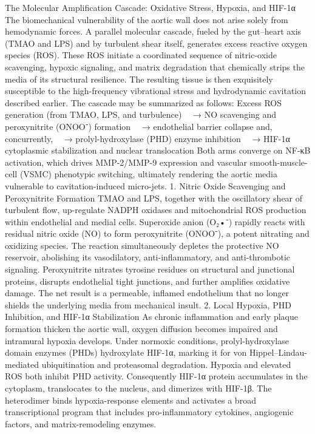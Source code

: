 The Molecular Amplification Cascade: Oxidative Stress, Hypoxia, and HIF-1α
The biomechanical vulnerability of the aortic wall does not arise solely from hemodynamic forces. A parallel molecular cascade, fueled by the gut–heart axis (TMAO and LPS) and by turbulent shear itself, generates excess reactive oxygen species (ROS). These ROS initiate a coordinated sequence of nitric-oxide scavenging, hypoxic signaling, and matrix degradation that chemically strips the media of its structural resilience. The resulting tissue is then exquisitely susceptible to the high-frequency vibrational stress and hydrodynamic cavitation described earlier. The cascade may be summarized as follows:
Excess ROS generation (from TMAO, LPS, and turbulence)
 → NO scavenging and peroxynitrite (ONOO⁻) formation
 → endothelial barrier collapse  
and, concurrently,  
 → prolyl-hydroxylase (PHD) enzyme inhibition
 → HIF-1α cytoplasmic stabilization and nuclear translocation  
Both arms converge on NF-κB activation, which drives MMP-2/MMP-9 expression and vascular smooth-muscle-cell (VSMC) phenotypic switching, ultimately rendering the aortic media vulnerable to cavitation-induced micro-jets.
1. Nitric Oxide Scavenging and Peroxynitrite Formation
TMAO and LPS, together with the oscillatory shear of turbulent flow, up-regulate NADPH oxidases and mitochondrial ROS production within endothelial and medial cells. Superoxide anion (O₂•⁻) rapidly reacts with residual nitric oxide (NO) to form peroxynitrite (ONOO⁻), a potent nitrating and oxidizing species. The reaction simultaneously depletes the protective NO reservoir, abolishing its vasodilatory, anti-inflammatory, and anti-thrombotic signaling. Peroxynitrite nitrates tyrosine residues on structural and junctional proteins, disrupts endothelial tight junctions, and further amplifies oxidative damage. The net result is a permeable, inflamed endothelium that no longer shields the underlying media from mechanical insult.
2. Local Hypoxia, PHD Inhibition, and HIF-1α Stabilization
As chronic inflammation and early plaque formation thicken the aortic wall, oxygen diffusion becomes impaired and intramural hypoxia develops. Under normoxic conditions, prolyl-hydroxylase domain enzymes (PHDs) hydroxylate HIF-1α, marking it for von Hippel–Lindau-mediated ubiquitination and proteasomal degradation. Hypoxia and elevated ROS both inhibit PHD activity. Consequently HIF-1α protein accumulates in the cytoplasm, translocates to the nucleus, and dimerizes with HIF-1β. The heterodimer binds hypoxia-response elements and activates a broad transcriptional program that includes pro-inflammatory cytokines, angiogenic factors, and matrix-remodeling enzymes.
